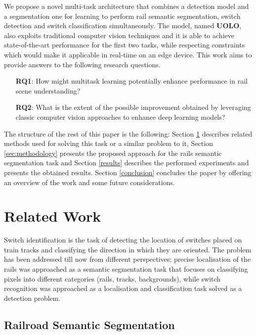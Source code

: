 \documentclass[conference]{IEEEtran}
\begin{document}
We propose a novel multi-task architecture that combines a detection model and a segmentation one for learning to perform rail semantic segmentation, switch detection and switch classification simultaneously.
The model, named \textbf{UOLO}, also exploits traditional computer vision techniques and it is able to achieve state-of-the-art performance for the first two tasks, while respecting constraints which would make it applicable in real-time on an edge device. This work aims to provide answers to the following research questions. 

\begin{enumerate}
    \item[\textbf{RQ1}:] 
    How might multitask learning potentially enhance performance in rail scene understanding?
    \item[\textbf{RQ2}:] 
    What is the extent of the possible improvement obtained by leveraging classic computer vision approaches to enhance deep learning models?
\end{enumerate}

The structure of the rest of this paper is the following: Section \ref{relWork} describes related methods used for solving this task or a similar problem to it, Section \ref{sec:methodology} presents the proposed approach for the rails semantic segmentation task and Section \ref{results} describes the performed experiments  and presents the obtained results. Section \ref{conclusion} concludes the paper by offering an overview of the work and some future considerations.

\section{Related Work}
\label{relWork}

Switch identification is the task of detecting the location of switches placed on train tracks and classifying the direction in which they are oriented. The problem has been addressed till now from different perspectives: precise localisation of the rails was approached as a semantic segmentation task that focuses on classifying pixels into different categories (rails, tracks, backgrounds), while switch recognition was approached as a localisation and classification task solved as a detection problem.

\subsection{Railroad Semantic Segmentation}
\end{document}
